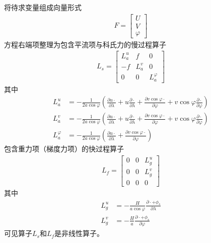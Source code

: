 \documentclass{ctexart}
\begin{document}
将待求变量组成向量形式
\begin{align}
  F = \left[
    \begin{array}{c}
      U \\
      V \\
      \varphi
    \end{array}
  \right]
\end{align}
方程右端项整理为包含平流项与科氏力的慢过程算子
\begin{align}
  L_s = \left[
    \begin{array}{ccc}
      L_a^u & f & 0 \\
      - f & L_a^v & 0 \\
      0 & 0 & L_a^\varphi
    \end{array}
  \right]
\end{align}
其中
\begin{align}
  L_a^u & = - \frac{1}{2 a \cos{\varphi}} \left( \frac{\partial u \cdot}{\partial \lambda} + u \frac{\partial \cdot}{\partial \lambda} + \frac{\partial v \cos{\varphi} \cdot}{\partial \varphi} + v \cos{\varphi} \frac{\partial \cdot}{\partial \varphi}  \right) \\
  L_a^v & = - \frac{1}{2 a \cos{\varphi}} \left( \frac{\partial u \cdot}{\partial \lambda} + u \frac{\partial \cdot}{\partial \lambda} + \frac{\partial v \cos{\varphi} \cdot}{\partial \varphi} + v \cos{\varphi} \frac{\partial \cdot}{\partial \varphi} \right) \\
  L_a^\varphi & = - \frac{1}{2 a \cos{\varphi}} \left( \frac{\partial u \cdot}{\partial \lambda} + \frac{\partial v \cos{\varphi} \cdot}{\partial \varphi} \right)
\end{align}
包含重力项（梯度力项）的快过程算子
\begin{align}
  L_f = \left[
    \begin{array}{ccc}
      0 & 0 & L_g^u \\
      0 & 0 & L_g^v \\
      0 & 0 & 0
    \end{array}
  \right]
\end{align}
其中
\begin{align}
  L_g^u & = - \frac{H}{a \cos{\varphi}} \frac{\partial \cdot + \phi_s}{\partial \lambda} \\
  L_g^v & = - \frac{H}{a} \frac{\partial \cdot + \phi_s}{\partial \varphi}
\end{align}
可见算子$L_s$和$L_f$是非线性算子。
\end{document}
